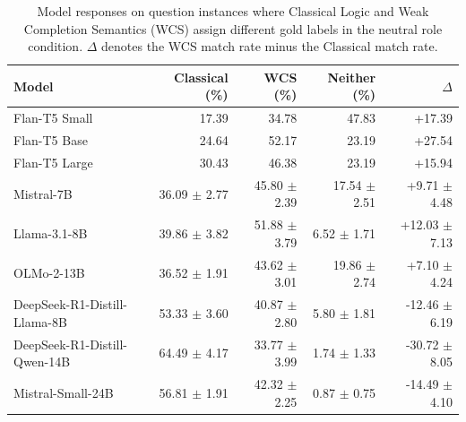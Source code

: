 \begin{table}[H]
\caption{Model responses on question instances where Classical Logic and Weak Completion Semantics (WCS) assign different gold labels in the neutral role condition. $\Delta$ denotes the WCS match rate minus the Classical match rate.}
\label{tab:disagreement-neutral-final}
\begin{tabular}{lrrrr}
\toprule
Model & Classical (\%) & WCS (\%) & Neither (\%) & $\Delta$ \\
\midrule
Flan-T5 Small & 17.39 & 34.78 & 47.83 & +17.39 \\
Flan-T5 Base & 24.64 & 52.17 & 23.19 & +27.54 \\
Flan-T5 Large & 30.43 & 46.38 & 23.19 & +15.94 \\
Mistral-7B & 36.09 $\pm$ 2.77 & 45.80 $\pm$ 2.39 & 17.54 $\pm$ 2.51 & +9.71 $\pm$ 4.48 \\
Llama-3.1-8B & 39.86 $\pm$ 3.82 & 51.88 $\pm$ 3.79 & 6.52 $\pm$ 1.71 & +12.03 $\pm$ 7.13 \\
OLMo-2-13B & 36.52 $\pm$ 1.91 & 43.62 $\pm$ 3.01 & 19.86 $\pm$ 2.74 & +7.10 $\pm$ 4.24 \\
DeepSeek-R1-Distill-Llama-8B & 53.33 $\pm$ 3.60 & 40.87 $\pm$ 2.80 & 5.80 $\pm$ 1.81 & -12.46 $\pm$ 6.19 \\
DeepSeek-R1-Distill-Qwen-14B & 64.49 $\pm$ 4.17 & 33.77 $\pm$ 3.99 & 1.74 $\pm$ 1.33 & -30.72 $\pm$ 8.05 \\
Mistral-Small-24B & 56.81 $\pm$ 1.91 & 42.32 $\pm$ 2.25 & 0.87 $\pm$ 0.75 & -14.49 $\pm$ 4.10 \\
\bottomrule
\end{tabular}
\end{table}
